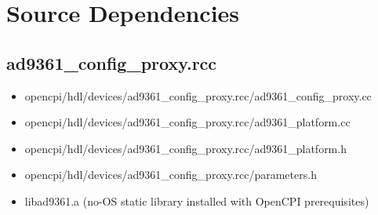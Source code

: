 \documentclass{article}
\def\comp{ad9361\_config\_proxy}
\begin{document}
\section*{Source Dependencies}
\subsection*{\comp.rcc}
\begin{itemize}
	\item opencpi/hdl/devices/\comp{}.rcc/\comp{}.cc
	\item opencpi/hdl/devices/\comp{}.rcc/ad9361\_platform.cc
	\item opencpi/hdl/devices/\comp{}.rcc/ad9361\_platform.h
	\item opencpi/hdl/devices/\comp{}.rcc/parameters.h
	\item libad9361.a (no-OS static library installed with OpenCPI prerequisites)
\end{itemize}
\end{document}
